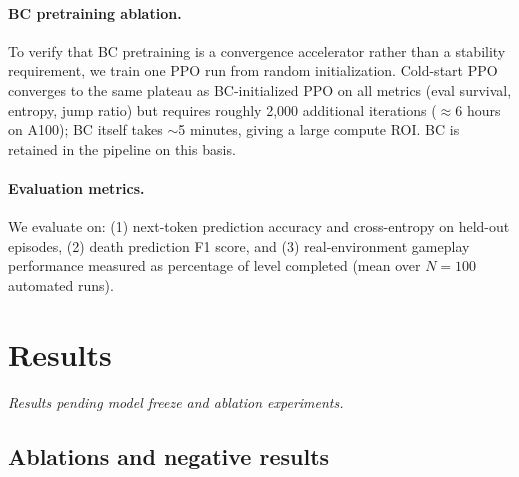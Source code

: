 \documentclass{article}
\begin{document}
\paragraph{BC pretraining ablation.}
To verify that BC pretraining is a convergence accelerator rather than a stability requirement, we train one PPO run from random initialization.
Cold-start PPO converges to the same plateau as BC-initialized PPO on all metrics (eval survival, entropy, jump ratio) but requires roughly 2{,}000 additional iterations (${\approx}6$ hours on A100); BC itself takes $\sim$5 minutes, giving a large compute ROI.
BC is retained in the pipeline on this basis.

\paragraph{Evaluation metrics.}
We evaluate on: (1) next-token prediction accuracy and cross-entropy on held-out episodes, (2) death prediction F1 score, and (3) real-environment gameplay performance measured as percentage of level completed (mean over $N = 100$ automated runs).

\section{Results}
\label{sec:results}


\textit{Results pending model freeze and ablation experiments.}

\subsection{Ablations and negative results}
\label{sec:ablations}
\end{document}
